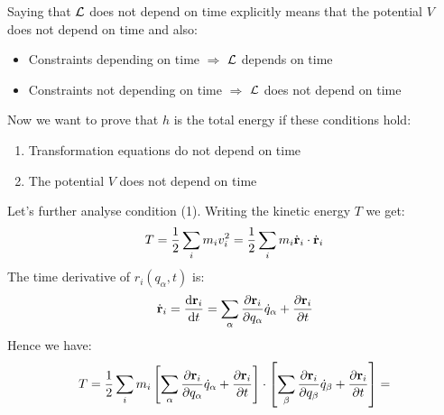 Saying that $\mathcal{L}$ does not depend on time explicitly means that the potential $V$ does not depend on time and also:
\begin{itemize}
    \item Constraints depending on time $\Rightarrow$ $\mathcal{L}$ depends on time
    \item Constraints not depending on time $\Rightarrow$ $\mathcal{L}$ does not depend on time
\end{itemize}
Now we want to prove that $h$ is the total energy if these conditions hold:
\begin{enumerate}
    \item Transformation equations do not depend on time
    \item The potential $V$ does not depend on time
\end{enumerate}
Let's further analyse condition (1). Writing the kinetic energy $T$ we get:
\begin{equation}
    T = \dfrac{1}{2}\displaystyle\sum_i m_i v_i^2 = \dfrac{1}{2}\displaystyle\sum_i m_i \dot{\vb{r}}_i \cdot \dot{\vb{r}}_i
\end{equation}
The time derivative of $r_i(q_{\alpha},t)$ is:
\begin{equation}
    \dvec{r}_i = \dfrac{\dd{\vec{r}_i}}{\dd{t}} = \bigsum_{\alpha}\pdv{ \vec{r}_i}{ q_{\alpha}}\dot{q}_{\alpha} + \pdv{ \vec{r}_i}{ t}
\end{equation}
Hence we have:
\begin{equation}
    T = \dfrac{1}{2}\bigsum_i m_i \sqbr{\bigsum_{\alpha}\pdv{ \vec{r}_i}{ q_{\alpha}}\dot{q}_{\alpha} + \pdv{ \vec{r}_i}{ t}} \cdot \sqbr{\bigsum_{\beta}\pdv{ \vec{r}_i}{ q_{\beta}}\dot{q}_{\beta} + \pdv{ \vec{r}_i}{ t}} =
\end{equation}

